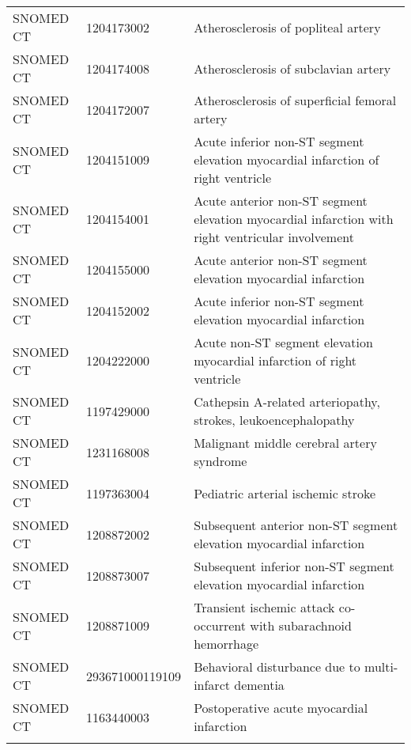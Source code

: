 \begin{longtable}{p{}p{}p{}}
  SNOMED CT & 1204173002 & Atherosclerosis of popliteal artery \\ 
  SNOMED CT & 1204174008 & Atherosclerosis of subclavian artery \\ 
  SNOMED CT & 1204172007 & Atherosclerosis of superficial femoral artery \\ 
  SNOMED CT & 1204151009 & Acute inferior non-ST segment elevation myocardial infarction of right ventricle \\ 
  SNOMED CT & 1204154001 & Acute anterior non-ST segment elevation myocardial infarction with right ventricular involvement \\ 
  SNOMED CT & 1204155000 & Acute anterior non-ST segment elevation myocardial infarction \\ 
  SNOMED CT & 1204152002 & Acute inferior non-ST segment elevation myocardial infarction \\ 
  SNOMED CT & 1204222000 & Acute non-ST segment elevation myocardial infarction of right ventricle \\ 
  SNOMED CT & 1197429000 & Cathepsin A-related arteriopathy, strokes, leukoencephalopathy \\ 
  SNOMED CT & 1231168008 & Malignant middle cerebral artery syndrome \\ 
  SNOMED CT & 1197363004 & Pediatric arterial ischemic stroke \\ 
  SNOMED CT & 1208872002 & Subsequent anterior non-ST segment elevation myocardial infarction \\ 
  SNOMED CT & 1208873007 & Subsequent inferior non-ST segment elevation myocardial infarction \\ 
  SNOMED CT & 1208871009 & Transient ischemic attack co-occurrent with subarachnoid hemorrhage \\ 
  SNOMED CT & 293671000119109 & Behavioral disturbance due to multi-infarct dementia \\ 
  SNOMED CT & 1163440003 & Postoperative acute myocardial infarction \\ 
  \hline
\label{tab:codes_cardiovascular_disease}
\end{longtable}
